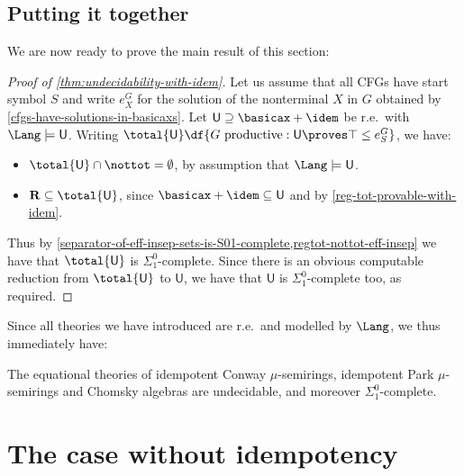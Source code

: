 \subsection{Putting it together}
We are now ready to prove the main result of this section:

\begin{proof}
    [Proof of \cref{thm:undecidability-with-idem}]
    Let us assume that all CFGs have start symbol $S$ and write $e^G_X$ for the solution of the nonterminal $X$ in $G$ obtained by \cref{cfgs-have-solutions-in-basicaxs}.
    Let $\mathsf U \supseteq \basicax+\idem$ be r.e.\ with $\Lang \models \mathsf U$.  
    Writing $\total {\mathsf U} \df \{G \text{ productive} : \mathsf U \proves \top \leq e^G_S \}$,
    we have:
    \begin{itemize}
        \item $\total {\mathsf U}  \cap \nottot = \emptyset$, by assumption that $\Lang \models \mathsf U$.
        \item $\mathbf R \subseteq \total {\mathsf U}  $, since $\basicax+\idem \subseteq \mathsf U$ and by \cref{reg-tot-provable-with-idem}.
    \end{itemize}
    Thus by \cref{separator-of-eff-insep-sets-is-S01-complete,regtot-nottot-eff-insep} we have that $\total {\mathsf U}$ is $\Sigma^0_1$-complete.
    Since there is an obvious computable reduction from $\total {\mathsf U}$ to $\mathsf U$, we have that $\mathsf U$ is $\Sigma^0_1$-complete too, as required.
\end{proof}


Since all theories we have introduced are r.e.\ and modelled by $\Lang$, we thus immediately have:
\begin{corollary}
    The equational theories of idempotent Conway $\mu$-semirings, idempotent Park $\mu$-semirings and Chomsky algebras are undecidable, and moreover $\Sigma^0_1$-complete.
\end{corollary}

\section{The case without idempotency}
\label{sec:undec-without-idem}


